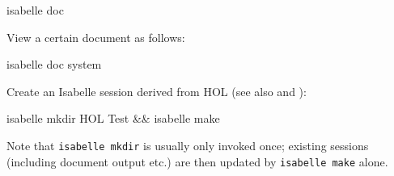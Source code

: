 \begin{isabellebody}
\begin{isamarkuptext}
\begin{ttbox}
  isabelle doc
\end{ttbox}

  View a certain document as follows:
\begin{ttbox}
  isabelle doc system
\end{ttbox}

  Create an Isabelle session derived from HOL (see also
   and ):
\begin{ttbox}
  isabelle mkdir HOL Test && isabelle make
\end{ttbox}
  Note that \verb|isabelle mkdir| is usually only invoked once;
  existing sessions (including document output etc.) are then updated
  by \verb|isabelle make| alone.%
\end{isamarkuptext}%
\isamarkuptrue%
%
\isadelimtheory
%
\endisadelimtheory
%
\isatagtheory
{}\isamarkupfalse%
%
\endisatagtheory
{\isafoldtheory}%
%
\isadelimtheory
%
\endisadelimtheory
\end{isabellebody}%
